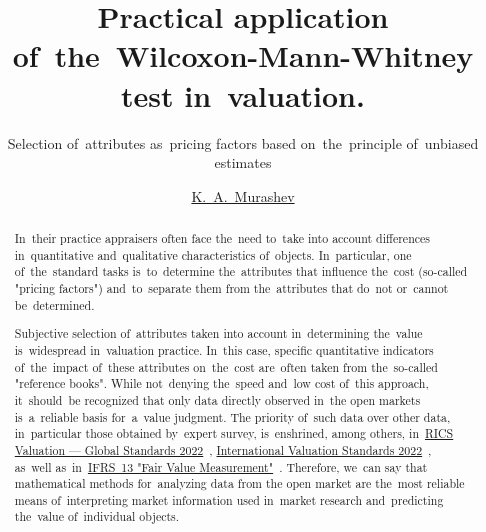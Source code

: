 \documentclass[russian,english]{scrreprt}
\title{Practical application of~the~Wilcoxon-Mann-Whitney test in~valuation.}
\subtitle{Selection of~attributes as~pricing factors based on~the~principle of~unbiased estimates}
\author{\href{https://www.facebook.com/groups/1977067932456703}{K.~A.~Murashev}}
\begin{document}
\maketitle
%
%	
\begin{abstract}
	In~their practice appraisers often face the~need to~take into account differences in~quantitative and~qualitative characteristics of~objects. In~particular, one of~the~standard tasks is~to~determine the~attributes that influence the~cost (so-called "pricing factors") and~to~separate them from the~attributes that do~not or~cannot be~determined.
	
	Subjective selection of~attributes taken into account in~determining the~value is~widespread in~valuation practice. In~this case, specific quantitative indicators of~the~impact of~these attributes on~the~cost are~often taken from the~so-called "reference books". While not~denying the~speed and~low cost of~this approach, it~should~be recognized that only data directly observed in~the open markets is~a~reliable basis for~a~value judgment. The priority of~such data over other data, in~particular those obtained by~expert survey, is~enshrined, among others, in~\href{https://www.rics.org/uk/upholding-professional-standards/sector-standards/valuation/red-book/red-book-global/}{RICS Valuation --- Global Standards 2022}~\cite{RVGS-2022}, \href{https://www.rics.org/uk/upholding-professional-standards/sector-standards/valuation/red-book/international-valuation-standards/}{International Valuation Standards 2022}~\cite{IVS-2022}, as~well as~in~\href{http://eifrs.ifrs.org/eifrs/bnstandards/en/IFRS13.pdf}{IFRS~13 "Fair Value Measurement"}~\cite{IFRS-13}. Therefore, we~can say that mathematical methods for~analyzing data from the open market are the~most reliable means of~interpreting market information used in~market research and~predicting the~value of~individual objects.
	

\end{abstract}
\end{document}
